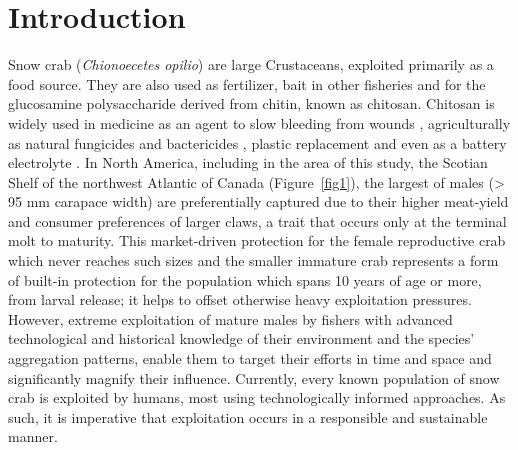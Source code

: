 \documentclass[
	letterpaper, %
	10pt, %
]{article}
\begin{document}



\section{Introduction}

Snow crab (\emph{Chionoecetes opilio}) are large Crustaceans, exploited primarily as a food source. They are also used as fertilizer, bait in other fisheries and for the glucosamine polysaccharide derived from chitin, known as chitosan. Chitosan is widely used in medicine as an agent to slow bleeding from wounds \cite{Zhang_et_al_2015, Moghadas_et_al_2016}, 
agriculturally as natural fungicides and bactericides \cite{Linden_Stoner_2007}, plastic replacement \cite{Tampieri_et_al_2003} and even as a battery electrolyte \cite{Poosapati_et_al_2021}. In North America, including in the area of this study, the Scotian Shelf of the northwest Atlantic of Canada (Figure~\ref{fig1}), the largest of males (> 95 mm carapace width) are preferentially captured due to their higher meat-yield and consumer preferences of larger claws, a trait that occurs only at the terminal molt to maturity. This market-driven protection for the female reproductive crab which never reaches such sizes and the smaller immature crab represents a form of built-in protection for the population which spans 10 years of age or more, from larval release; it helps to offset otherwise heavy exploitation pressures. However, extreme 
exploitation of mature males by fishers with advanced technological and historical knowledge of their environment and the species' aggregation patterns, 
enable them to target their efforts in time and space and significantly magnify their influence. Currently, every known population of snow crab is exploited by humans, most using technologically informed approaches. As such, it is imperative that exploitation occurs in a responsible and sustainable manner. 
\end{document}
